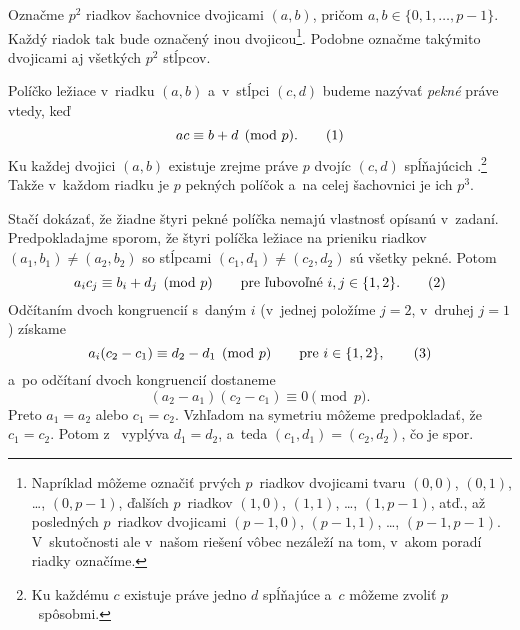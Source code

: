 {%
Označme $p^2$ riadkov šachovnice
dvojicami $(a,b)$, pričom $a,b\in\{0,1,\dots,p-1\}$. Každý riadok tak bude označený inou dvojicou\footnote{Napríklad môžeme označiť prvých $p$~riadkov dvojicami tvaru $(0,0)$, $(0,1)$, \dots, $(0,p-1)$, ďalších $p$~riadkov $(1,0)$, $(1,1)$, \dots, $(1,p-1)$, atď., až posledných $p$~riadkov dvojicami $(p-1,0)$, $(p-1,1)$, \dots, $(p-1,p-1)$. V~skutočnosti ale v~našom riešení vôbec nezáleží na tom, v~akom poradí riadky označíme.}. Podobne označme takýmito dvojicami aj všetkých $p^2$ stĺpcov.

Políčko ležiace v~riadku $(a,b)$ a~v~stĺpci $(c,d)$ budeme nazývať {\it pekné\/} práve vtedy, keď
$$
ac\equiv b+d\pmod p. \tag1
$$
Ku každej dvojici $(a,b)$ existuje zrejme práve $p$ dvojíc $(c,d)$ spĺňajúcich .\footnote{Ku každému $c$ existuje práve jedno $d$ spĺňajúce  a~$c$ môžeme zvoliť $p$~spôsobmi.}
Takže v~každom riadku je $p$ pekných políčok a~na celej šachovnici je ich $p^3$.

Stačí dokázať, že žiadne štyri pekné políčka nemajú vlastnosť opísanú v~zadaní. Predpokladajme sporom, že štyri políčka ležiace na prieniku riadkov $(a_1,b_1)\ne(a_2,b_2)$ so stĺpcami $(c_1,d_1)\ne(c_2,d_2)$ sú všetky pekné. Potom
$$
a_ic_j\equiv b_i+d_j\pmod p\qquad\text{pre ľubovoľné $i,j\in\{1,2\}$.}
\tag2
$$
Odčítaním dvoch kongruencií  s~daným $i$ (v~jednej položíme $j=2$, v~druhej $j=1$) získame
$$
a_i(c_2-c_1)\equiv d_2-d_1\pmod p\qquad\text{pre $i\in\{1,2\}$},
\tag3
$$
a~po odčítaní dvoch kongruencií  dostaneme
$$
(a_2-a_1)(c_2-c_1)\equiv 0\pmod p.
$$
Preto $a_1=a_2$ alebo $c_1=c_2$. Vzhľadom na symetriu môžeme predpokladať, že $c_1=c_2$. Potom z~ vyplýva $d_1=d_2$, a~teda
$(c_1,d_1)=(c_2,d_2)$, čo je spor.
}

